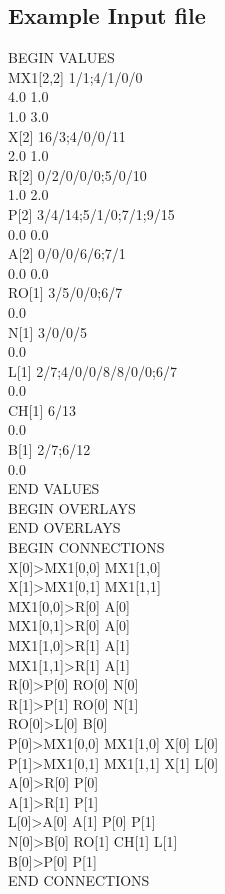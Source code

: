 \documentclass[12pt,a4paper]{article}
\begin{document}
\subsection{Example Input file}
BEGIN VALUES\\
MX1[2,2] 1/1;4/1/0/0\\
4.0 1.0\\
1.0 3.0\\
X[2] 16/3;4/0/0/11\\
2.0 1.0\\
R[2] 0/2/0/0/0;5/0/10\\
1.0 2.0\\
P[2] 3/4/14;5/1/0;7/1;9/15\\
0.0 0.0\\
A[2] 0/0/0/6/6;7/1\\
0.0 0.0\\
RO[1] 3/5/0/0;6/7\\
0.0\\
N[1] 3/0/0/5\\
0.0\\
L[1] 2/7;4/0/0/8/8/0/0;6/7\\
0.0\\
CH[1] 6/13\\
0.0\\
B[1] 2/7;6/12\\
0.0\\
END VALUES\\
BEGIN OVERLAYS\\
END OVERLAYS\\
BEGIN CONNECTIONS\\
X[0]>MX1[0,0] MX1[1,0]\\
X[1]>MX1[0,1] MX1[1,1]\\
MX1[0,0]>R[0] A[0]\\
MX1[0,1]>R[0] A[0]\\
MX1[1,0]>R[1] A[1]\\
MX1[1,1]>R[1] A[1]\\
R[0]>P[0] RO[0] N[0]\\
R[1]>P[1] RO[0] N[1]\\
RO[0]>L[0] B[0]\\
P[0]>MX1[0,0] MX1[1,0] X[0] L[0]\\
P[1]>MX1[0,1] MX1[1,1] X[1] L[0]\\
A[0]>R[0] P[0]\\
A[1]>R[1] P[1]\\
L[0]>A[0] A[1] P[0] P[1]\\
N[0]>B[0] RO[1] CH[1] L[1]\\
B[0]>P[0] P[1]\\
END CONNECTIONS\\
\end{document}
